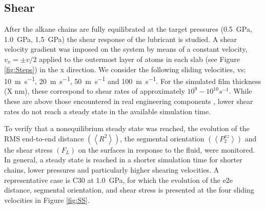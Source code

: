 \documentclass[aps,prb,reprint,superscriptaddress, a4paper]{revtex4-1}
\begin{document}


\subsection{Shear}

After the alkane chains are fully equilibrated at the target pressures (\SI{0.5}{\giga\pascal}, \SI{1.0}{\giga\pascal}, \SI{1.5}{\giga\pascal}) the shear response of the lubricant is studied. A shear velocity gradient was imposed on the system by means of a constant velocity, $v_x = \pm v/2$ applied to the outermost layer of atoms in each slab (see Figure \ref{fig:Steps}) in the x direction. We consider the following sliding velocities, vs; \SI{10}{\meter\per\second}, \SI{20}{\meter\per\second}, \SI{50}{\meter\per\second} and \SI{100}{\meter\per\second}. For the simulated film thickness (X nm), these correspond to shear rates of approximately $10^{9} - 10^{10} s^{-1}$. While these are above those encountered in real engineering components \cite{Taylor2017}, lower shear rates do not reach a steady state in the available simulation time\cite{Ewen2018}.

To verify that a nonequilibrium steady state was reached, the evolution of the RMS end-to-end distance $\left(\left< R^2 \right> \right)$, the segmental orientation $\left(\left<P_{2}^{xz} \right> \right)$ and the shear stress $\left(F_L \right)$ on the surfaces in response to the fluid, were monitored. In general, a steady state is reached in a shorter simulation time for shorter chains, lower pressures and particularly higher shearing velocities. A representative case is C30 at \SI{1.0}{\giga\pascal}, for which the evolution of the e2e distance, segmental orientation, and shear stress is presented at the four sliding velocities in Figure \ref{fig:SS}.
\end{document}
